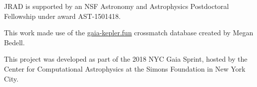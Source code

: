 \documentclass[preprint2]{aastex62}
\newcommand{\Kepler}{\textsl{Kepler}\xspace}
\begin{document}
%



\acknowledgments

JRAD is supported by an NSF Astronomy and Astrophysics Postdoctoral Fellowship under award AST-1501418. 

This work made use of the \url{gaia-kepler.fun} crossmatch database created by Megan Bedell.

This project was developed as part of the 2018 NYC Gaia Sprint, hosted by the Center for Computational Astrophysics at the Simons Foundation in New York City.

%





\end{document}
